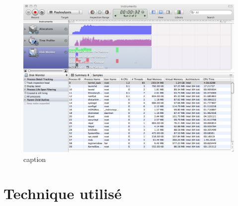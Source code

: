 \begin{figure}[htbp]
	\centering
		\includegraphics[width=6in]{Image/captureInstruments.png}
	\caption{caption}
	\label{fig:Image_captureInstruments}
\end{figure}



\section{Technique utilisé} %
\label{sec:technique_utilisé}




